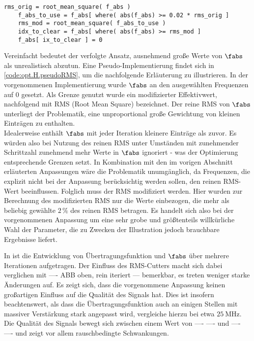 \documentclass[../Report.tex]{subfiles}
\begin{document}
\lstset{language=Python}
\begin{lstlisting}[caption={Pseudocode zur Veranschaulichung der Anpassung des Korrekturterms}, label=code:opt.H.pseudoRMS, numbers=none]
	rms_orig = root_mean_square( f_abs )
	f_abs_to_use = f_abs[ where( abs(f_abs) >= 0.02 * rms_orig ] 
	rms_mod = root_mean_square( f_abs_to_use )
	idx_to_clear = f_abs[ where( abs(f_abs) >= rms_mod ] 
	f_abs[ ix_to_clear ] = 0
\end{lstlisting}

Vereinfacht bedeutet der verfolgte Ansatz, ausnehmend große Werte von $\fabs$ als unrealistisch abzutun. Eine Pseudo-Implementierung findet sich in \ref{code:opt.H.pseudoRMS}, um die nachfolgende Erläuterung zu illustrieren. In der vorgenommenen Implementierung wurde $\fabs$ an den ausgewählten Frequenzen auf $0$ gesetzt. Als Grenze genutzt wurde ein modifizierter Effektivwert, nachfolgend mit RMS (Root Mean Square) bezeichnet. 
Der reine RMS von $\fabs$ unterliegt der Problematik, eine unproportional große Gewichtung von kleinen Einträgen zu enthalten.
\\
Idealerweise enthält $\fabs$ mit jeder Iteration kleinere Einträge als zuvor. Es würden also bei Nutzung des reinen RMS unter Umständen mit zunehmender Schrittzahl zunehmend mehr Werte in $\fabs$ ignoriert - was der Optimierung entsprechende Grenzen setzt. 
In Kombination mit den im vorigen Abschnitt erläuterten Anpassungen wäre die Problematik unumgänglich, da Frequenzen, die explizit nicht bei der Anpassung berücksichtig werden sollen, den reinen RMS-Wert beeinflussen.
Folglich muss der RMS modifiziert werden. Hier wurden zur Berechnung des modifizierten RMS nur die Werte einbezogen, die mehr als beliebig gewählte $2 \, \%$ des reinen RMS betragen. Es handelt sich also bei der vorgenommenen Anpassung um eine sehr grobe und größtenteils willkürliche Wahl der Parameter, die zu Zwecken der Illustration jedoch brauchbare Ergebnisse liefert.
 


In  ist die Entwicklung von Übertragungsfunktion und $\fabs$ über mehrere Iterationen aufgetragen. Der Einfluss des RMS-Cutters macht sich dabei verglichen mit ---- ABB oben, rein iteriert --- bemerkbar, es treten weniger starke Änderungen auf. 
Es zeigt sich, dass die vorgenommene Anpassung keinen großartigen Einfluss auf die Qualität des Signals hat.
Dies ist insofern beachtenswert, als dass die Übertragungsfunktion auch an einigen Stellen mit massiver Verstärkung stark angepasst wird, vergleiche hierzu  bei etwa $\SI{25}{\MHz}$.
Die Qualität des Signals bewegt sich zwischen einem Wert von ---- ---- und ---- ---- und zeigt vor allem rauschbedingte Schwankungen.
\end{document}

